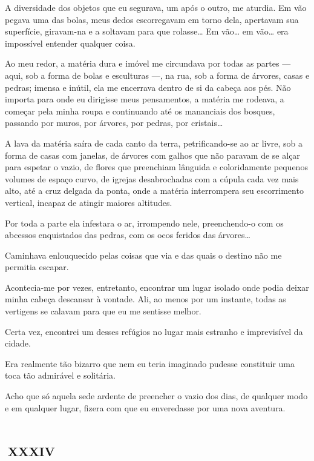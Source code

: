 A diversidade dos objetos que eu segurava, um após o outro, me aturdia. Em vão pegava uma das bolas, meus dedos escorregavam em torno dela, apertavam sua superfície, giravam-na e a soltavam para que rolasse\ldots{} Em vão\ldots{} em vão\ldots{} era impossível entender qualquer coisa.

Ao meu redor, a matéria dura e imóvel me circundava por todas as partes --- aqui, sob a forma de bolas e esculturas ---, na rua, sob a forma de árvores, casas e pedras; imensa e inútil, ela me encerrava dentro de si da cabeça aos pés. Não importa para onde eu dirigisse meus pensamentos, a matéria me rodeava, a começar pela minha roupa e continuando até os mananciais dos bosques, passando por muros, por árvores, por pedras, por cristais\ldots{}

A lava da matéria saíra de cada canto da terra, petrificando-se ao ar livre, sob a forma de casas com janelas, de árvores com galhos que não paravam de se alçar para espetar o vazio, de flores que preenchiam lânguida e coloridamente pequenos volumes de espaço curvo, de igrejas desabrochadas com a cúpula cada vez mais alto, até a cruz delgada da ponta, onde a matéria interrompera seu escorrimento vertical, incapaz de atingir maiores altitudes.

Por toda a parte ela infestara o ar, irrompendo nele, preenchendo-o com os abcessos enquistados das pedras, com os ocos feridos das árvores\ldots{}

Caminhava enlouquecido pelas coisas que via e das quais o destino não me permitia escapar.

Acontecia-me por vezes, entretanto, encontrar um lugar isolado onde podia deixar minha cabeça descansar à vontade. Ali, ao menos por um instante, todas as vertigens se calavam para que eu me sentisse melhor.

Certa vez, encontrei um desses refúgios no lugar mais estranho e imprevisível da cidade.

Era realmente tão bizarro que nem eu teria imaginado pudesse constituir uma toca tão admirável e solitária.

Acho que só aquela sede ardente de preencher o vazio dos dias, de qualquer modo e em qualquer lugar, fizera com que eu enveredasse por uma nova aventura.


\chapter*{\small{}\,\Large\centering\textsc{xxxiv}\,\small{}}

